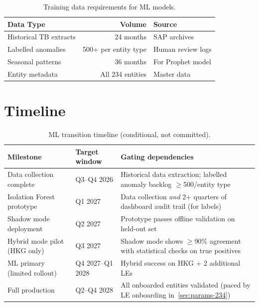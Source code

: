 \documentclass[11pt,a4paper,twoside]{report}
\begin{document}
\begin{table}[htbp]
\centering
\caption{Training data requirements for ML models.}
\footnotesize
\begin{tabularx}{\linewidth}{@{}l r X@{}}
\toprule
\textbf{Data Type} & \textbf{Volume} & \textbf{Source} \\ \midrule
Historical TB extracts & 24 months & SAP archives \\
Labelled anomalies & 500+ per entity type & Human review logs \\
Seasonal patterns & 36 months & For Prophet model \\
Entity metadata & All 234 entities & Master data \\
\bottomrule
\end{tabularx}
\end{table}

\section{Timeline}

\begin{table}[htbp]
\centering
\caption{ML transition timeline (conditional, not committed).}
\label{tab:ml-timeline}
\footnotesize
\begin{tabularx}{\linewidth}{@{}l l X@{}}
\toprule
\textbf{Milestone} & \textbf{Target window} & \textbf{Gating dependencies} \\ \midrule
Data collection complete & Q3--Q4 2026 & Historical data extraction; labelled anomaly backlog $\ge$500/entity type \\
Isolation Forest prototype & Q1 2027 & Data collection \emph{and} 2+ quarters of dashboard audit trail (for labels) \\
Shadow mode deployment & Q2 2027 & Prototype passes offline validation on held-out set \\
Hybrid mode pilot (HKG only) & Q3 2027 & Shadow mode shows $\ge$90\% agreement with statistical checks on true positives \\
ML primary (limited rollout) & Q4 2027--Q1 2028 & Hybrid success on HKG + 2 additional LEs \\
Full production & Q2--Q4 2028 & All onboarded entities validated (paced by LE onboarding in~\cref{sec:params-234}) \\
\bottomrule
\end{tabularx}
\end{table}
\end{document}
